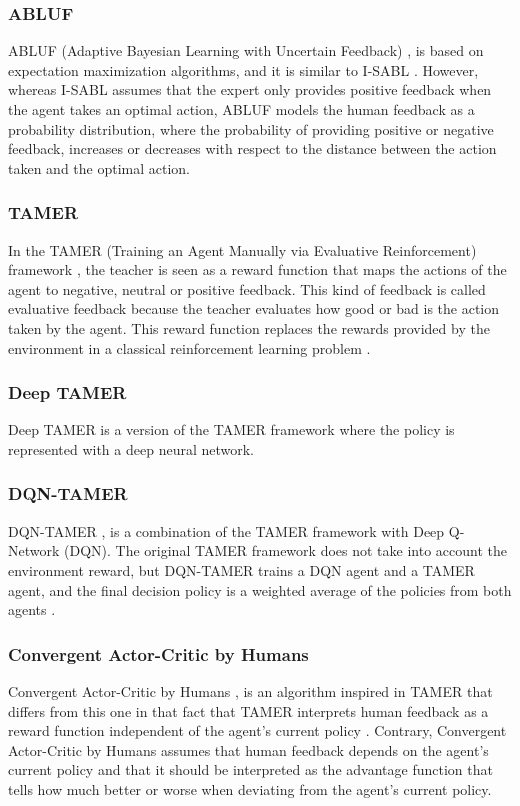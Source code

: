 \subsubsection*{ABLUF}
ABLUF (Adaptive Bayesian Learning with Uncertain Feedback) \cite{ABLUF-he:2020}, is based on expectation maximization algorithms, and it is similar to I-SABL \cite{I-SABL-Loftin:2016}. However, whereas I-SABL assumes that the expert only provides positive feedback when the agent takes an optimal action, ABLUF models the human feedback as a probability distribution, where the probability of providing positive or negative feedback, increases or decreases with respect to the distance between the action taken and the optimal action.



\subsubsection*{TAMER}
In the TAMER (Training an Agent Manually via Evaluative Reinforcement) framework \cite{TAMER-Knox-Stone:2009}, the teacher is seen as a reward function that maps the actions of the agent to negative, neutral or positive feedback. This kind of feedback is called evaluative feedback because the teacher evaluates how good or bad is the action taken by the agent. This reward function replaces the rewards provided by the environment in a classical reinforcement learning problem \cite{leveraging-human-guidance:2019}.
 

\subsubsection*{Deep TAMER}
Deep TAMER \cite{DeepTAMER-Warnell-et-al:2018} is a version of the TAMER framework \cite{TAMER-Knox-Stone:2009} where the policy is represented with a deep neural network.

\subsubsection*{DQN-TAMER}
DQN-TAMER \cite{DQN-TAMER-Arakawa:2018}, is a combination of the TAMER framework \cite{TAMER-Knox-Stone:2009} with Deep Q-Network (DQN). The original TAMER framework does not take into account the environment reward, but DQN-TAMER trains a DQN agent and a TAMER agent, and the final decision policy is a weighted average of the policies from both agents \cite{leveraging-human-guidance:2019}.

\subsubsection*{Convergent Actor-Critic by Humans}
Convergent Actor-Critic by Humans \cite{fakeCOACH-MacGlashan-Ho-Loftin:2017}, is an algorithm inspired in TAMER \cite{TAMER-Knox-Stone:2009} that differs from this one in that fact that TAMER interprets human feedback as a reward function independent of the agent’s current policy \cite{leveraging-human-guidance:2019}. 
Contrary, Convergent Actor-Critic by Humans assumes that human feedback depends on the agent's current policy and that it should be interpreted as the advantage function that tells how much better or worse when deviating from the agent’s current policy.

